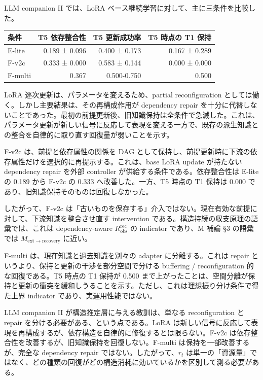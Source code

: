 \documentclass[12pt,a4paper]{article}
\begin{document}
LLM companion II では、LoRA ベース継続学習に対して、主に三条件を比較した。

{\def\LTcaptype{table} %
\begin{longtable}[]{@{}lrrr@{}}
\toprule\noalign{}
条件 & T5 依存整合性 & T5 更新成功率 & T5 時点の T1 保持 \\
\midrule\noalign{}
\endhead
\bottomrule\noalign{}
\endlastfoot
E-lite & 0.189 ± 0.096 & 0.400 ± 0.173 & 0.167 ± 0.289 \\
F-v2c & 0.333 ± 0.000 & 0.583 ± 0.144 & 0.000 ± 0.000 \\
F-multi & 0.367 & 0.500-0.750 & 0.500 \\
\end{longtable}
}

LoRA 逐次更新は、パラメータを変えるため、partial reconfiguration としては働く。しかし主要結果は、その再構成作用が dependency repair を十分に代替しないことであった。最初の前提更新後、旧知識保持は全条件で急減した。これは、パラメータ更新が新しい信号に反応して表現を変える一方で、既存の派生知識との整合を自律的に取り直す回復量が弱いことを示す。

F-v2c は、前提と依存属性の関係を DAG として保持し、前提更新時に下流の依存属性だけを選択的に再提示する。これは、base LoRA update が持たない dependency repair を外部 controller が供給する条件である。依存整合性は E-lite の 0.189 から F-v2c の 0.333 へ改善した。一方、T5 時点の T1 保持は 0.000 であり、旧知識保持そのものは回復しなかった。

したがって、F-v2c は「古いものを保存する」介入ではない。現在有効な前提に対して、下流知識を整合させ直す intervention である。構造持続の収支原理の語彙では、これは dependency-aware \(R_{\mathrm{obs}}^{\mathrm{rec}}\) の indicator であり、M 補論 §3 の語彙では \(M_{\mathrm{ext}\to\mathrm{recovery}}\) に近い。

F-multi は、現在知識と過去知識を別々の adapter に分離する。これは repair というより、保持と更新の干渉を部分空間で分ける buffering / reconfiguration 的な回復である。T5 時点の T1 保持が 0.500 まで上がったことは、空間分離が保持と更新の衝突を緩和しうることを示す。ただし、これは理想振り分け条件で得た上界 indicator であり、実運用性能ではない。

LLM companion II が構造推定層に与える教訓は、単なる reconfiguration と repair を分ける必要がある、という点である。LoRA は新しい信号に反応して表現を再構成するが、依存構造を自律的に修復するとは限らない。F-v2c は依存整合性を改善するが、旧知識保持を回復しない。F-multi は保持を一部改善するが、完全な dependency repair ではない。したがって、\(r_{t}\) は単一の「資源量」ではなく、どの種類の回復がどの構造消耗に効いているかを区別して測る必要がある。
\end{document}
